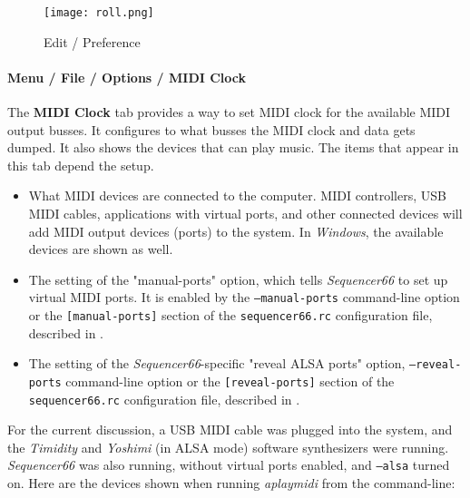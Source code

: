 \begin{figure}[H]
   \centering 
   \texttt{[image: roll.png]}
   \caption{Edit / Preference}
   \label{fig:seq66_options_tab_0_9_18}
\end{figure}

\paragraph{Menu / File / Options / MIDI Clock}
\label{paragraph:seq66_menu_file_options_midi_clock}

   The \textbf{MIDI Clock} tab provides a way to set MIDI clock for
   the available MIDI output busses.
   It configures to what busses the MIDI clock and data gets dumped.
   It also shows the devices that can play music.
   The items that appear in this tab depend the setup.

   \begin{itemize}
      \item What MIDI devices are connected to the computer.
         MIDI controllers, USB MIDI cables, applications with virtual
         ports, and other connected devices will add MIDI
         output devices (ports) to the system.
         In \textsl{Windows}, the available devices are shown as well.
      \item The setting of the "manual-ports" option, which tells
         \textsl{Sequencer66} to set up virtual MIDI ports.
         It is enabled by the
         \texttt{--manual-ports} command-line option or the
         \texttt{[manual-ports]} section of the
         \texttt{sequencer66.rc} configuration file, described in
         .
      \item The setting of the \textsl{Sequencer66}-specific
         "reveal ALSA ports" option,
         \texttt{--reveal-ports} command-line option or the
         \texttt{[reveal-ports]} section of the
         \texttt{sequencer66.rc} configuration file, described in
         .
   \end{itemize}

   For the current discussion, a USB MIDI cable was plugged into the system,
   and the \textsl{Timidity} and \textsl{Yoshimi} (in ALSA mode) software
   synthesizers were running.  \textsl{Sequencer66} was also running,
   without virtual ports enabled, and \texttt{--alsa} turned on.
   Here are the devices shown when running \textsl{aplaymidi}
   from the command-line:

